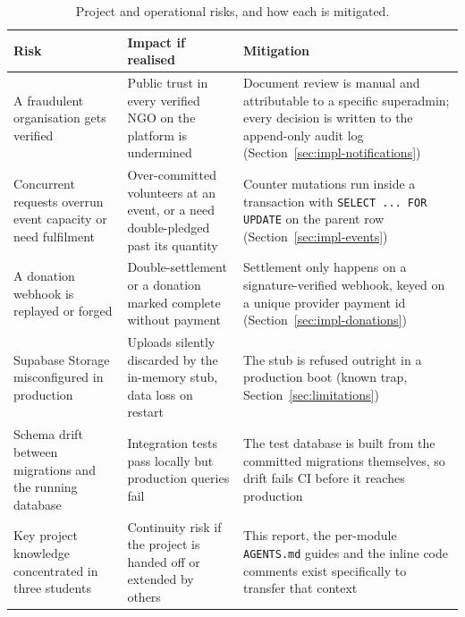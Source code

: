 \begin{table}[H]\centering
\caption{Project and operational risks, and how each is mitigated.}
\label{tab:risks}
\begin{tabularx}{\textwidth}{|p{}|p{}|X|}
\hline
\textbf{Risk} & \textbf{Impact if realised} & \textbf{Mitigation}\\\hline
A fraudulent organisation gets verified & Public trust in every verified NGO on the platform is undermined & Document review is manual and attributable to a specific superadmin; every decision is written to the append-only audit log (Section~\ref{sec:impl-notifications})\\\hline
Concurrent requests overrun event capacity or need fulfilment & Over-committed volunteers at an event, or a need double-pledged past its quantity & Counter mutations run inside a transaction with \texttt{SELECT ... FOR UPDATE} on the parent row (Section~\ref{sec:impl-events})\\\hline
A donation webhook is replayed or forged & Double-settlement or a donation marked complete without payment & Settlement only happens on a signature-verified webhook, keyed on a unique provider payment id (Section~\ref{sec:impl-donations})\\\hline
Supabase Storage misconfigured in production & Uploads silently discarded by the in-memory stub, data loss on restart & The stub is refused outright in a production boot (known trap, Section~\ref{sec:limitations})\\\hline
Schema drift between migrations and the running database & Integration tests pass locally but production queries fail & The test database is built from the committed migrations themselves, so drift fails CI before it reaches production\\\hline
Key project knowledge concentrated in three students & Continuity risk if the project is handed off or extended by others & This report, the per-module \texttt{AGENTS.md} guides and the inline code comments exist specifically to transfer that context\\\hline
\end{tabularx}
\end{table}

